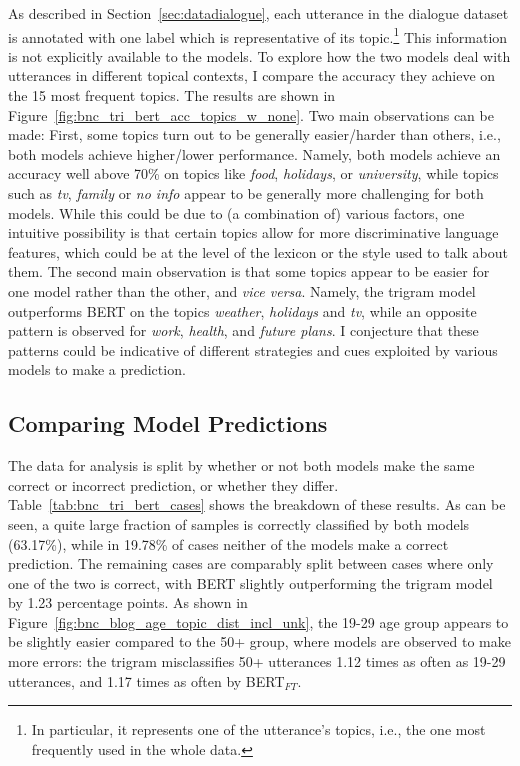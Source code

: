 As described in Section~\ref{sec:datadialogue}, each utterance in the dialogue dataset is annotated with one label which is representative of its topic.\footnote{In particular, it represents one of the utterance's topics, i.e., the one most frequently used in the whole data.} This information is not explicitly available to the models.
To explore how the two models deal with utterances in different topical contexts, I compare the accuracy they achieve on the 15 most frequent topics. The results are shown in Figure~\ref{fig:bnc_tri_bert_acc_topics_w_none}. Two main observations can be made: First, some topics turn out to be generally easier/harder than others, i.e., both models achieve higher/lower performance. Namely, both models achieve an accuracy well above 70\% on topics like \emph{food}, \emph{holidays}, or \emph{university}, while topics such as \emph{tv}, \emph{family} or \emph{no info} appear to be generally more challenging for both models. While this could be due to (a combination of) various factors, one intuitive possibility is that certain topics allow for more discriminative language features, which could be at the level of the lexicon or the style used to talk about them. The second main observation is that some topics appear to be easier for one model rather than the other, and \emph{vice versa}. Namely, the trigram model outperforms BERT on the topics \emph{weather}, \emph{holidays} and \emph{tv}, while an opposite pattern is observed for \emph{work}, \emph{health}, and \emph{future plans}. I conjecture that these patterns could be indicative of different strategies and cues exploited by various models to make a prediction. 

\subsection{Comparing Model Predictions}
\label{subsec:exp1_comparing_model_preds}
The data for analysis is split by whether or not both models make the same correct or incorrect prediction, or whether they differ. Table~\ref{tab:bnc_tri_bert_cases} shows the breakdown of these results.
As can be seen, a quite large fraction of samples is correctly classified by both models (63.17\%), while in 19.78\% of cases neither of the models make a correct prediction. The remaining cases are comparably split between cases where only one of the two is correct, with BERT slightly outperforming the trigram model by 1.23 percentage points. %
As shown in Figure~\ref{fig:bnc_blog_age_topic_dist_incl_unk}, the 19-29 age group appears to be slightly easier compared to the 50+ group, where models are observed to make more errors: the trigram misclassifies 50+ utterances 1.12 times as often as 19-29 utterances, and 1.17 times as often by BERT$_{FT}$.

